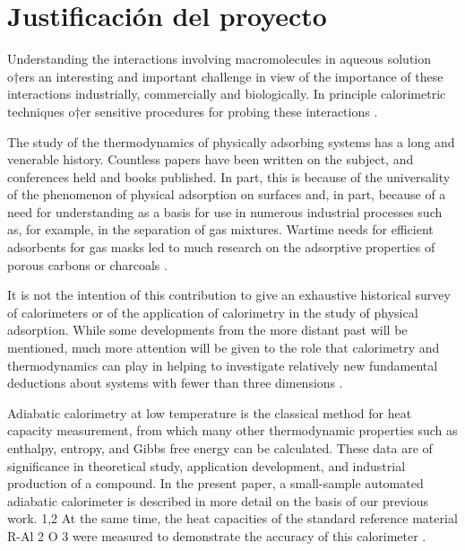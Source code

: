 	
	
	


	
	

	
\section{Justificación del proyecto}
	Understanding the interactions involving macromolecules in aqueous solution o†ers an interesting and important challenge in view of the importance of these interactions industrially, commercially and biologically. In principle calorimetric techniques o†er sensitive procedures for probing these interactions \cite{blandamer1998titration}.

	The study of the thermodynamics of physically adsorbing systems has a long and venerable history. Countless papers have been written on the subject, and conferences held and books published. In part, this is because of the universality of the phenomenon of physical adsorption on surfaces and, in part, because of a need for understanding as a basis for use in numerous industrial processes such as, for example, in the separation of gas mixtures. Wartime needs for efficient adsorbents for gas masks led to much research on the adsorptive properties of porous carbons or charcoals \cite{morrison1987calorimetry}.
	
	It is not the intention of this contribution to give an exhaustive historical survey of	calorimeters or of the application of calorimetry in the study of physical adsorption.	While some developments from the more distant past will be mentioned, much more attention
	will be given to the role that calorimetry and thermodynamics can play in helping to investigate relatively new fundamental deductions about systems with fewer than three dimensions \cite{morrison1987calorimetry}.
	
	Adiabatic calorimetry at low temperature is the classical method for heat capacity measurement, from which many other thermodynamic properties such as enthalpy, entropy, and Gibbs free energy can be calculated. These data are of significance in theoretical study, application development, and industrial production of a compound. In the present
	paper, a small-sample automated adiabatic calorimeter is
	described in more detail on the basis of our previous
	work. 1,2 At the same time, the heat capacities of the
	standard reference material R-Al 2 O 3 were measured to
	demonstrate the accuracy of this calorimeter \cite{wang2005determination}.
	
